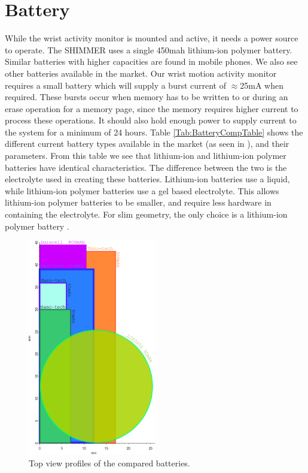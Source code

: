 \section{Battery}
\label{Sec:Battery}

While the wrist activity monitor is mounted and active, it needs a power source to operate.
The SHIMMER \cite{Web:ShimmerHome} uses a single 450mah lithium-ion polymer battery.
Similar batteries with higher capacities are found in mobile phones. We also see other batteries available in the market.
Our wrist motion activity monitor requires a small battery which will supply a burst current of $\approx$25mA when required.
These bursts occur when memory has to be written to or during an erase operation for a memory page,
since the memory requires higher current to process these operations.
It should also hold enough power to supply current to the system for a minimum of 24 hours.
Table \ref{Tab:BatteryCompTable} shows the different current battery types available in the market (as seen in \cite{Web:BatteryTable}), and their parameters. From this table we see that lithium-ion and lithium-ion polymer batteries have identical characteristics.
The difference between the two is the electrolyte used in creating these batteries.
Lithium-ion batteries use a liquid,
while lithium-ion polymer batteries use a gel based electrolyte.
This allows lithium-ion polymer batteries to be smaller,
and require less hardware in containing the electrolyte.
For slim geometry, the only choice is a lithium-ion polymer battery \cite{Web:BatteryTable}.
\begin{figure}
\begin{center}
\includegraphics[width=0.5\textwidth]{images/battcompare.eps}
\caption{Top view profiles of the compared batteries.}
\label{Fig:BattComp}
\end{center}
\end{figure}
